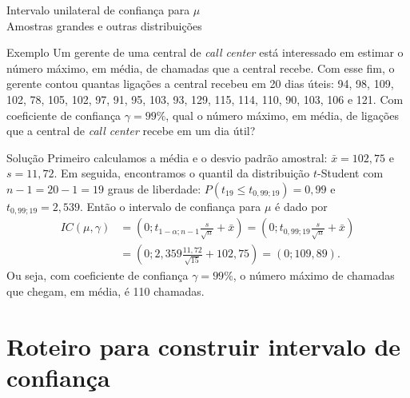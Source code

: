 \documentclass[8pt]{beamer}
\begin{document}
\begin{frame}{Intervalo unilateral de confiança para $\mu$\\ Amostras grandes e outras distribuições}

\normalsize

\begin{block}{Exemplo}
	Um gerente de uma central de \textit{call center} 	está interessado em estimar o número máximo, em média, de chamadas que a central recebe. Com esse fim, o gerente contou quantas ligações a central recebeu em 20 dias úteis: 94, 98, 109, 102,  78, 105, 102,  97,  91,  95, 103,  93, 129, 115, 114, 110,  90, 103, 106 e 121. Com coeficiente de confiança $\gamma=99\%$, qual o número máximo, em média, de ligações que a central de \textit{call center} recebe em um dia útil?
\end{block}

\begin{block}{Solução}
	Primeiro calculamos a média e o desvio padrão amostral: $\bar{x} = 102,75$ e $s = 11,72$. Em seguida, encontramos o quantil da distribuição $t$-Student com $n-1=20-1=19$ graus de liberdade: $P(t_{19} \leq t_{0,99; 19}) = 0,99$ e $t_{0,99; 19} = 2,539$. Então o intervalo de confiança para $\mu$ é dado por
	\begin{align*}
	IC(\mu, \gamma) &= \left( 0; t_{1-\alpha;n-1} \frac{s}{\sqrt{n}} + \bar{x} \right)= \left(0; t_{0,99;19} \frac{s}{\sqrt{n}}  + \bar{x} \right) \\
	&= \left( 0; 2,359 \frac{11,72}{\sqrt{15}} + 102,75 \right) = \left( 0; 109,89 \right).
	\end{align*} 
	Ou seja, com coeficiente de confiança $\gamma=99\%$, o número máximo de chamadas que chegam, em média, é 110 chamadas.
	
\end{block}
\normalsize

\end{frame}

\section{Roteiro para construir intervalo de confiança}
\end{document}
